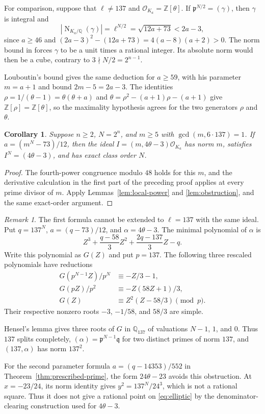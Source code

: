 \documentclass[11pt,leqno,oneside,letterpaper]{amsart}
\newtheorem{corollary}[theorem]{Corollary}
\theoremstyle{remark}
\newtheorem{remark}[theorem]{Remark}
\numberwithin{equation}{section}
\newcommand{\Q}{\mathbb Q}
\newcommand{\Z}{\mathbb Z}
\DeclareMathOperator{\Nm}{N}
\begin{document}
For comparison, suppose that $\ell\ne137$ and $\mathcal O_{K_a}=\Z[\theta]$. If $\mathfrak p^{N/2}=(\gamma)$, then $\gamma$ is integral and
\[
  |\Nm_{K_a/\Q}(\gamma)|=\ell^{N/2}=\sqrt{12a+73}<2a-3,
\]
since $a\geq46$ and $(2a-3)^2-(12a+73)=4(a-8)(a+2)>0$. The norm bound in \cite{KalaSgallovaTinkova2025} forces $\gamma$ to be a unit times a rational integer. Its absolute norm would then be a cube, contrary to $3\nmid N/2=2^{n-1}$.

Louboutin's bound \cite[Theorem 10]{Louboutin2001} gives the same deduction for $a\geq59$, with his parameter $m=a+1$ and bound $2m-5=2a-3$. The identities $\rho=1/(\theta-1)=\theta(\theta+a)$ and $\theta=\rho^2-(a+1)\rho-(a+1)$ give $\Z[\rho]=\Z[\theta]$, so the maximality hypothesis agrees for the two generators $\rho$ and $\theta$.

\begin{corollary}\label{cor:composite}
  Suppose $n\geq2$, $N=2^n$, and $m\geq5$ with $\gcd(m,6\cdot137)=1$. If $a=(m^N-73)/12$, then the ideal $I=(m,4\theta-3)\mathcal O_{K_a}$ has norm $m$, satisfies $I^N=(4\theta-3)$, and has exact class order $N$.
\end{corollary}

\begin{proof}
  The fourth-power congruence modulo $48$ holds for this $m$, and the derivative calculation in the first part of the preceding proof applies at every prime divisor of $m$. Apply Lemmas~\ref{lem:local-power} and \ref{lem:obstruction}, and the same exact-order argument.
\end{proof}

\begin{remark}\label{rem:137}
  The first formula cannot be extended to $\ell=137$ with the same ideal. Put $q=137^N$, $a=(q-73)/12$, and $\alpha=4\theta-3$. The minimal polynomial of $\alpha$ is
  \[
    Z^3+\frac{q-58}{3}Z^2+\frac{2q-137}{3}Z-q.
  \]
  Write this polynomial as $G(Z)$ and put $p=137$. The following three rescaled polynomials have reductions
  \begin{align*}
    G(p^{N-1}Z)/p^N & \equiv -Z/3-1,              \\
    G(pZ)/p^2       & \equiv -Z(58Z+1)/3,         \\
    G(Z)            & \equiv Z^2(Z-58/3) \pmod p.
  \end{align*}
  Their respective nonzero roots $-3$, $-1/58$, and $58/3$ are simple.

  Hensel's lemma gives three roots of $G$ in $\Q_{137}$ of valuations $N-1$, $1$, and $0$. Thus $137$ splits completely, $(\alpha)=\mathfrak p^{N-1}\mathfrak q$ for two distinct primes of norm $137$, and $(137,\alpha)$ has norm $137^2$.

  For the second parameter formula $a=(q-14353)/552$ in Theorem~\ref{thm:prescribed-prime}, the form $24\theta-23$ avoids this obstruction. At $x=-23/24$, its norm identity gives $y^2=137^N/24^3$, which is not a rational square. Thus it does not give a rational point on \eqref{eq:elliptic} by the denominator-clearing construction used for $4\theta-3$.
\end{remark}
\end{document}
